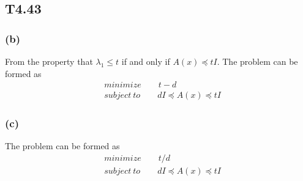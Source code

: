 \subsection*{T4.43}
\subsubsection*{(b)}
From the property that $\lambda_1 \leq t$ if and only if $A(x)\preceq tI$. The problem can be formed as 
\begin{align*}
&minimize \qquad t-d\\
&subject\ to \qquad dI \preceq A(x) \preceq tI
\end{align*}
\subsubsection*{(c)}
The problem can be formed as 
\begin{align*}
&minimize \qquad t/d\\
&subject\ to \qquad dI \preceq A(x) \preceq tI
\end{align*}